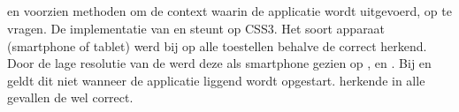 \subsection{}
\label{sec:evaluatie-ondersteuning-toestel}

\st{} en \kendo{} voorzien methoden om de context waarin de applicatie wordt uitgevoerd,  op te vragen.
De implementatie van \jqm{} en \lungo{} steunt op CSS3.
Het soort apparaat (smartphone of tablet) werd bij op alle toestellen behalve de \gtab correct herkend.
Door de lage resolutie van de \gtab{} werd deze als smartphone gezien op \st{},  \jqm{} en \lungo{}.
Bij \jqm{} en \lungo{} geldt dit niet wanneer de applicatie liggend wordt opgestart.
\kendo{} herkende in alle gevallen de \gtab{} wel correct.


% 
% 
% 

\subsection{}
\label{sec:evaluatie-ondersteuning-formulieren}

